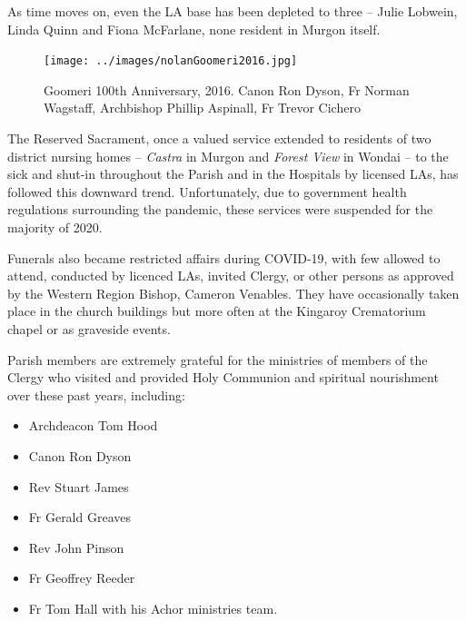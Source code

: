 As time moves on, even the LA base has been depleted to three -- Julie Lobwein, Linda Quinn and Fiona McFarlane, none resident in Murgon itself.









\begin{figure}[!htb]
\begin{center}
\texttt{[image: ../images/nolanGoomeri2016.jpg]}
\caption{Goomeri 100th Anniversary, 2016. Canon Ron Dyson, Fr Norman Wagstaff, Archbishop Phillip Aspinall, Fr Trevor Cichero}
\end{center}
\end{figure}




The Reserved Sacrament, once a valued service extended to residents of two district nursing homes -- \emph{Castra} in Murgon and \emph{Forest View} in Wondai -- to the sick and shut-in throughout the Parish and in the Hospitals by licensed LAs, has followed this downward trend. Unfortunately, due to government health regulations surrounding the pandemic, these services were suspended for the majority of 2020.



Funerals also became restricted affairs during COVID-19, with few allowed to attend, conducted by licenced LAs, invited Clergy, or other persons as approved by the Western Region Bishop, Cameron Venables. They have occasionally taken place in the church buildings but more often at the Kingaroy Crematorium chapel or as graveside events.



Parish members are extremely grateful for the ministries of members of the Clergy who visited and provided Holy Communion and spiritual nourishment over these past years, including:



\begin{itemize}

\item

  Archdeacon Tom Hood

\item

  Canon Ron Dyson

\item

  Rev Stuart James

\item

  Fr Gerald Greaves

\item

  Rev John Pinson

\item

  Fr Geoffrey Reeder

\item

  Fr Tom Hall with his Achor ministries team\emph{.}

\end{itemize}



